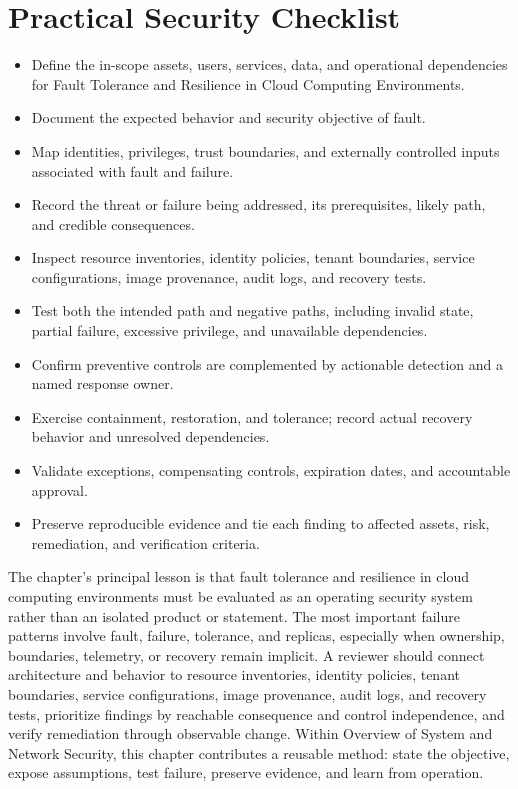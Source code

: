 \documentclass[11pt]{article}
\begin{document}
\section*{Practical Security Checklist}
\begin{itemize}[label=$\square$]
\item Define the in-scope assets, users, services, data, and operational dependencies for Fault Tolerance and Resilience in Cloud Computing Environments.
\item Document the expected behavior and security objective of fault.
\item Map identities, privileges, trust boundaries, and externally controlled inputs associated with fault and failure.
\item Record the threat or failure being addressed, its prerequisites, likely path, and credible consequences.
\item Inspect resource inventories, identity policies, tenant boundaries, service configurations, image provenance, audit logs, and recovery tests.
\item Test both the intended path and negative paths, including invalid state, partial failure, excessive privilege, and unavailable dependencies.
\item Confirm preventive controls are complemented by actionable detection and a named response owner.
\item Exercise containment, restoration, and tolerance; record actual recovery behavior and unresolved dependencies.
\item Validate exceptions, compensating controls, expiration dates, and accountable approval.
\item Preserve reproducible evidence and tie each finding to affected assets, risk, remediation, and verification criteria.
\end{itemize}
\begin{synthesisbox}
The chapter's principal lesson is that fault tolerance and resilience in cloud computing environments must be evaluated as an operating security system rather than an isolated product or statement. The most important failure patterns involve fault, failure, tolerance, and replicas, especially when ownership, boundaries, telemetry, or recovery remain implicit. A reviewer should connect architecture and behavior to resource inventories, identity policies, tenant boundaries, service configurations, image provenance, audit logs, and recovery tests, prioritize findings by reachable consequence and control independence, and verify remediation through observable change. Within Overview of System and Network Security, this chapter contributes a reusable method: state the objective, expose assumptions, test failure, preserve evidence, and learn from operation.
\end{synthesisbox}
\end{document}
